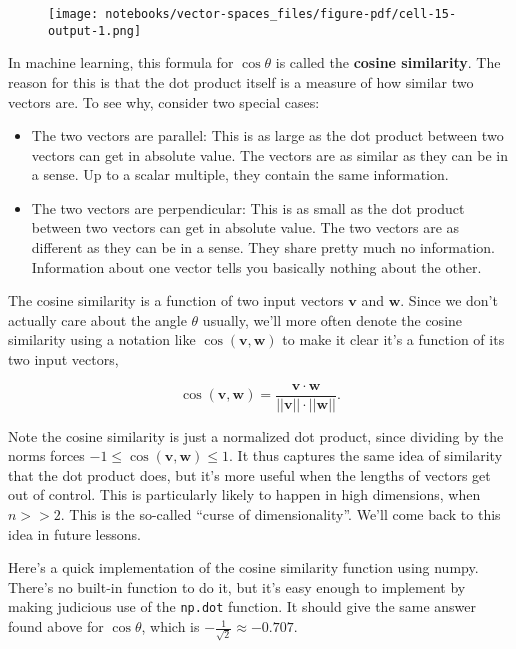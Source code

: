 \documentclass[
  letterpaper,
  DIV=11,
  numbers=noendperiod]{scrreprt}
\providecommand{\tightlist}{%
  \setlength{\itemsep}{0pt}\setlength{\parskip}{0pt}}\usepackage{longtable,booktabs,array}
\begin{document}
\begin{figure}[H]

{\centering \texttt{[image: notebooks/vector-spaces\_files/figure-pdf/cell-15-output-1.png]}

}

\end{figure}

In machine learning, this formula for \(\cos \theta\) is called the
\textbf{cosine similarity}. The reason for this is that the dot product
itself is a measure of how similar two vectors are. To see why, consider
two special cases:

\begin{itemize}
\tightlist
\item
  The two vectors are parallel: This is as large as the dot product
  between two vectors can get in absolute value. The vectors are as
  similar as they can be in a sense. Up to a scalar multiple, they
  contain the same information.
\item
  The two vectors are perpendicular: This is as small as the dot product
  between two vectors can get in absolute value. The two vectors are as
  different as they can be in a sense. They share pretty much no
  information. Information about one vector tells you basically nothing
  about the other.
\end{itemize}

The cosine similarity is a function of two input vectors \(\mathbf{v}\)
and \(\mathbf{w}\). Since we don't actually care about the angle
\(\theta\) usually, we'll more often denote the cosine similarity using
a notation like \(\cos(\mathbf{v},\mathbf{w})\) to make it clear it's a
function of its two input vectors,

\[\cos(\mathbf{v},\mathbf{w}) = \frac{\mathbf{v} \cdot \mathbf{w}}{||\mathbf{v}|| \cdot ||\mathbf{w}||}.\]

Note the cosine similarity is just a normalized dot product, since
dividing by the norms forces
\(-1 \leq \cos(\mathbf{v},\mathbf{w}) \leq 1\). It thus captures the
same idea of similarity that the dot product does, but it's more useful
when the lengths of vectors get out of control. This is particularly
likely to happen in high dimensions, when \(n >> 2\). This is the
so-called ``curse of dimensionality''. We'll come back to this idea in
future lessons.

Here's a quick implementation of the cosine similarity function using
numpy. There's no built-in function to do it, but it's easy enough to
implement by making judicious use of the \texttt{np.dot} function. It
should give the same answer found above for \(\cos \theta\), which is
\(-\frac{1}{\sqrt{2}} \approx -0.707\).
\end{document}
